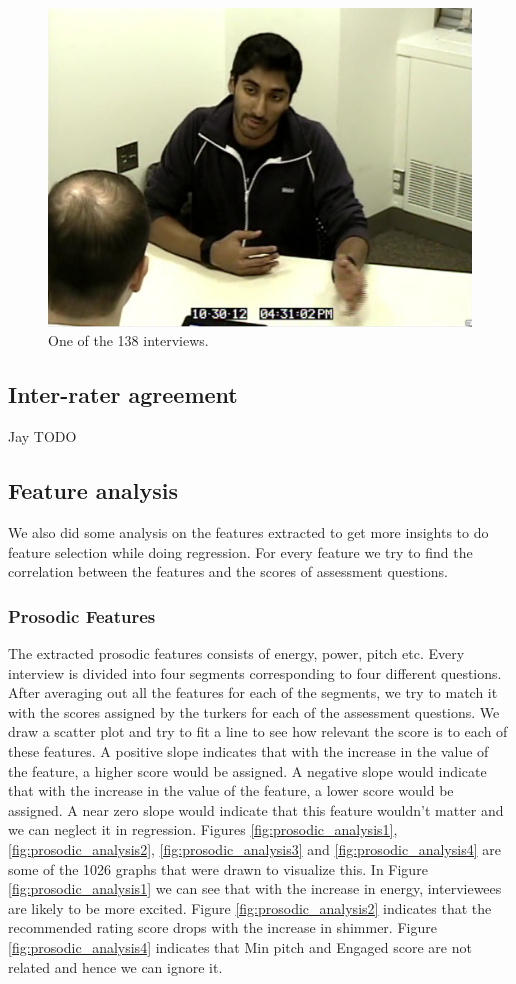 \documentclass[11pt]{article}
\begin{document}
\begin{figure}[h!]
\begin{center}
\includegraphics[width=0.7\columnwidth]{figures/Screenshot from 2016-10-21 20-30-05/Screenshot from 2016-10-21 20-30-05}
\caption{One of the 138 interviews.}
\label{fig:dataset}
\end{center}
\end{figure}

\subsection{Inter-rater agreement}
Jay TODO

\subsection{Feature analysis}
We also did some analysis on the features extracted to get more insights to do feature selection while doing regression. For every feature we try to find the correlation between the features and the scores of assessment questions.
\subsubsection{Prosodic Features}
The extracted prosodic features consists of energy, power, pitch etc. Every interview is divided into four segments corresponding to four different questions. After averaging out all the features for each of the segments, we try to match it with the scores assigned by the turkers for each of the assessment questions. We draw a scatter plot and try to fit a line to see how relevant the score is to each of these features. A positive slope indicates that with the increase in the value of the feature, a higher score would be assigned. A negative slope would indicate that with the increase in the value of the feature, a lower score would be assigned. A near zero slope would indicate that this feature wouldn't matter and we can neglect it in regression. Figures \ref{fig:prosodic_analysis1}, \ref{fig:prosodic_analysis2}, \ref{fig:prosodic_analysis3} and \ref{fig:prosodic_analysis4} are some of the 1026 graphs that were drawn to visualize this. In Figure \ref{fig:prosodic_analysis1} we can see that with the increase in energy, interviewees are likely to be more excited. Figure \ref{fig:prosodic_analysis2} indicates that the recommended rating score drops with the increase in shimmer. Figure \ref{fig:prosodic_analysis4} indicates that Min pitch and Engaged score are not related and hence we can ignore it. 
\end{document}
